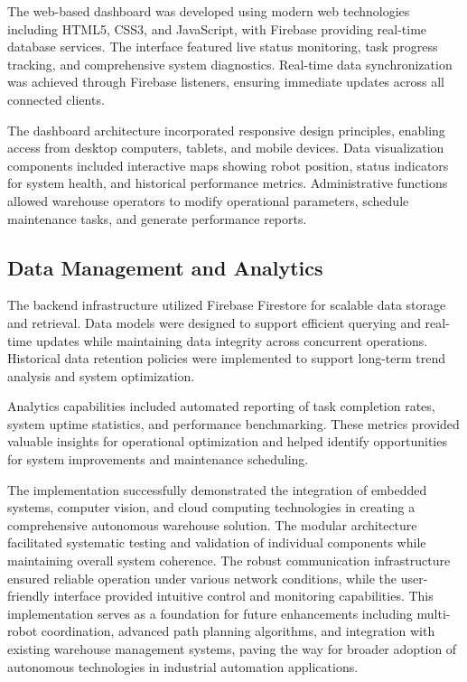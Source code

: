 The web-based dashboard was developed using modern web technologies including HTML5, CSS3, and JavaScript, with Firebase providing real-time database services. The interface featured live status monitoring, task progress tracking, and comprehensive system diagnostics. Real-time data synchronization was achieved through Firebase listeners, ensuring immediate updates across all connected clients.

The dashboard architecture incorporated responsive design principles, enabling access from desktop computers, tablets, and mobile devices. Data visualization components included interactive maps showing robot position, status indicators for system health, and historical performance metrics. Administrative functions allowed warehouse operators to modify operational parameters, schedule maintenance tasks, and generate performance reports.

\subsection{Data Management and Analytics}

The backend infrastructure utilized Firebase Firestore for scalable data storage and retrieval. Data models were designed to support efficient querying and real-time updates while maintaining data integrity across concurrent operations. Historical data retention policies were implemented to support long-term trend analysis and system optimization.

Analytics capabilities included automated reporting of task completion rates, system uptime statistics, and performance benchmarking. These metrics provided valuable insights for operational optimization and helped identify opportunities for system improvements and maintenance scheduling.

The implementation successfully demonstrated the integration of embedded systems, computer vision, and cloud computing technologies in creating a comprehensive autonomous warehouse solution. The modular architecture facilitated systematic testing and validation of individual components while maintaining overall system coherence. The robust communication infrastructure ensured reliable operation under various network conditions, while the user-friendly interface provided intuitive control and monitoring capabilities. This implementation serves as a foundation for future enhancements including multi-robot coordination, advanced path planning algorithms, and integration with existing warehouse management systems, paving the way for broader adoption of autonomous technologies in industrial automation applications.